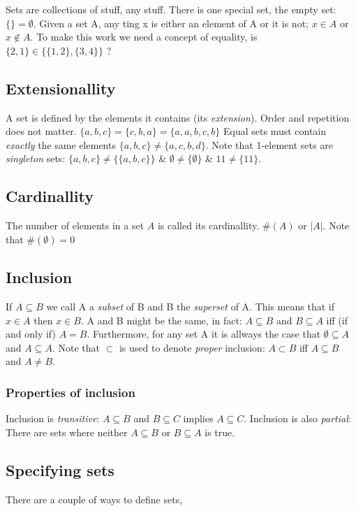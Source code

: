 \documentclass[12pt]{article} %
\begin{document}
Sets are collections of stuff, any stuff. There is one special set, the empty set: $\{\} = \emptyset$. Given a set A, any ting x is either an element of A or it is not; $x \in A$ or $x \notin A$. To make this work we need a concept of equality, is $\{2,1\} \in \{\{1,2\},\{3,4\}\}$ ? 

\subsection{Extensionallity}
A set is defined by the elements it contains (its \textit{extension}). Order and repetition does not matter. $\{a,b,c\} = \{c,b,a\} = \{a,a,b,c,b\}$ Equal sets must contain \textit{exactly} the same elements $\{a,b,c\} \neq \{a,c,b,d\}$. Note that 1-element sets are \textit{singleton} sets: $\{a,b,c\} \neq \{\{a,b,c\}\}$ \& $\emptyset \neq \{\emptyset\}$ \& $11 \neq \{11\}$.

\subsection{Cardinallity}

The number of elements in a set $A$ is called its cardinallity. $\#(A)$ or $|A|$. Note that $\#(\emptyset) = 0$

\subsection{Inclusion}
If $A \subseteq B$ we call A a \textit{subset} of B and B the \textit{superset} of A. This means that if $x \in A$ then $x \in B$. A and B might be the same, in fact: $A \subseteq B$ and $B \subseteq A$ iff (if and only if) $A = B$. Furthermore, for any set A it is allways the case that $\emptyset \subseteq A$ and $A \subseteq A$. Note that $\subset$ is used to denote \textit{proper} inclusion: $A \subset B$ iff $A \subseteq B$ and $A \neq B$.

\subsubsection{Properties of inclusion}
Inclusion is \textit{transitive}: $A \subseteq B$ and $B \subseteq C$ implies $A \subseteq C$. Inclusion is also \textit{partial}: There are sets where neither $A \subseteq B$ or $B \subseteq A$ is true.

\subsection{Specifying sets}
There are a couple of ways to define sets,
\end{document}
